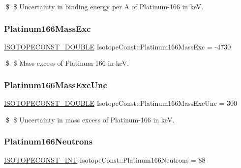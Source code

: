 \$ \$ Uncertainty in binding energy per A of Platinum-\/166 in keV. \mbox{\label{group___isotope_const-_platinum-_pt166_ga96ec3b037e1ba73668fcf32f7b93413b}} 
\subsubsection{\texorpdfstring{Platinum166\+Mass\+Exc}{Platinum166MassExc}}
{\footnotesize\ttfamily \mbox{\hyperlink{group___isotope_const-_macros_ga8f45a7272ce02c0b4c65c44636ed719a}{I\+S\+O\+T\+O\+P\+E\+C\+O\+N\+S\+T\+\_\+\+D\+O\+U\+B\+LE}} Isotope\+Const\+::\+Platinum166\+Mass\+Exc = -\/4730}

\$ \$ Mass excess of Platinum-\/166 in keV. \mbox{\label{group___isotope_const-_platinum-_pt166_ga7d464f1f7caa1daeb436c13c325766d9}} 
\subsubsection{\texorpdfstring{Platinum166\+Mass\+Exc\+Unc}{Platinum166MassExcUnc}}
{\footnotesize\ttfamily \mbox{\hyperlink{group___isotope_const-_macros_ga8f45a7272ce02c0b4c65c44636ed719a}{I\+S\+O\+T\+O\+P\+E\+C\+O\+N\+S\+T\+\_\+\+D\+O\+U\+B\+LE}} Isotope\+Const\+::\+Platinum166\+Mass\+Exc\+Unc = 300}

\$ \$ Uncertainty in mass excess of Platinum-\/166 in keV. \mbox{\label{group___isotope_const-_platinum-_pt166_gaba62f8a84ff3489403af3b7995565ade}} 
\subsubsection{\texorpdfstring{Platinum166\+Neutrons}{Platinum166Neutrons}}
{\footnotesize\ttfamily \mbox{\hyperlink{group___isotope_const-_macros_ga5f18360b3e99483a35c32d789e62621c}{I\+S\+O\+T\+O\+P\+E\+C\+O\+N\+S\+T\+\_\+\+I\+NT}} Isotope\+Const\+::\+Platinum166\+Neutrons = 88}

